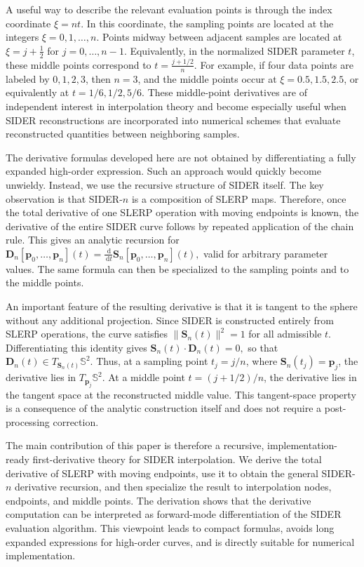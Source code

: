 \documentclass[a4paper,11pt]{article}
\newcommand{\bp}{\mathbf{p}}
\newcommand{\bD}{\mathbf{D}}
\numberwithin{equation}{section}
\theoremstyle{plain}
\theoremstyle{definition}
\theoremstyle{remark}
\newcommand{\Sph}{\mathbb{S}^2}
\newcommand{\dd}{\,\mathrm{d}}
\begin{document}
A useful way to describe the relevant evaluation points is through the index coordinate
$
        \xi=nt$.
In this coordinate, the sampling points are located at the integers \(\xi=0,1,\ldots,n\).  Points midway between adjacent samples are located at
$
        \xi=j+\frac12$ for $j=0,\ldots,n-1 .
$
Equivalently, in the normalized SIDER parameter \(t\), these middle points correspond to
$
        t=\frac{j+1/2}{n}.
$
For example, if four data points are labeled by \(0,1,2,3\), then \(n=3\), and the middle points occur at \(\xi=0.5,1.5,2.5\), or equivalently at \(t=1/6,1/2,5/6\).  These middle-point derivatives are of independent interest in interpolation theory and become especially useful when SIDER reconstructions are incorporated into numerical schemes that evaluate reconstructed quantities between neighboring samples.

The derivative formulas developed here are not obtained by differentiating a fully expanded high-order expression.  Such an approach would quickly become unwieldy.  Instead, we use the recursive structure of SIDER itself.  The key observation is that SIDER-\(n\) is a composition of SLERP maps.  Therefore, once the total derivative of one SLERP operation with moving endpoints is known, the derivative of the entire SIDER curve follows by repeated application of the chain rule.  This gives an analytic recursion for
\(\bD_n[\bp_0,\ldots,\bp_n](t) = \frac{\dd}{\dd t}\mathbf{S}_n[\bp_0,\ldots,\bp_n](t),\)
valid for arbitrary parameter values.  The same formula can then be specialized to the sampling points and to the middle points.

An important feature of the resulting derivative is that it is tangent to the sphere without any additional projection.  Since SIDER is constructed entirely from SLERP operations, the curve satisfies
$
        \|\mathbf{S}_n(t)\|^2=1
$
for all admissible \(t\).  Differentiating this identity gives
$
        \mathbf{S}_n(t)\cdot \bD_n(t)=0,
$
so that
$
        \bD_n(t)\in T_{\mathbf{S}_n(t)}\Sph .
$
Thus, at a sampling point \(t_j=j/n\), where \(\mathbf{S}_n(t_j)=\bp_j\), the derivative lies in \(T_{\bp_j}\Sph\).  At a middle point \(t=(j+1/2)/n\), the derivative lies in the tangent space at the reconstructed middle value.  This tangent-space property is a consequence of the analytic construction itself and does not require a post-processing correction.

The main contribution of this paper is therefore a recursive, implementation-ready first-derivative theory for SIDER interpolation.  We derive the total derivative of SLERP with moving endpoints, use it to obtain the general SIDER-\(n\) derivative recursion, and then specialize the result to interpolation nodes, endpoints, and middle points.  The derivation shows that the derivative computation can be interpreted as forward-mode differentiation of the SIDER evaluation algorithm.  This viewpoint leads to compact formulas, avoids long expanded expressions for high-order curves, and is directly suitable for numerical implementation.
\end{document}
